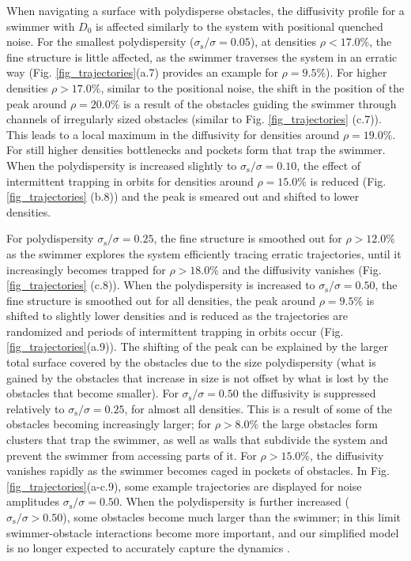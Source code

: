 \documentclass[aps,pre,twocolumn,showpacs,superscriptaddress,amsmath,amssymb,longbibliography]{revtex4-2}
\begin{document}
When navigating a surface with polydisperse obstacles, the diffusivity profile for a swimmer with $D_{\textrm{0}}$ is affected similarly to the system with positional quenched noise. For the smallest polydispersity ($\sigma_{\textrm{s}}/\sigma = 0.05$), at densities $\rho < 17.0 \% $, the fine structure is little affected, as the swimmer traverses the system in an erratic way (Fig. \ref{fig_trajectories}(a.7) provides an example for $\rho = 9.5 \%$). For higher densities $\rho > 17.0 \% $, similar to the positional noise, the shift in the position of the peak around $\rho = 20.0 \%$ is a result of the obstacles guiding the swimmer through channels of irregularly sized obstacles (similar to Fig. \ref{fig_trajectories} (c.7)). This leads to a local maximum in the diffusivity for densities around $\rho = 19.0\%$. For still higher densities bottlenecks and pockets form that trap the swimmer. When the polydispersity is increased slightly to $\sigma_{\textrm{s}}/\sigma = 0.10$, the effect of intermittent trapping in orbits for densities around $\rho = 15.0 \%$ is reduced (Fig. \ref{fig_trajectories} (b.8)) and the peak is smeared out and shifted to lower densities. 

For polydispersity  $\sigma_{\textrm{s}}/\sigma = 0.25$, the fine structure is smoothed out for $\rho > 12.0 \% $ as the swimmer explores the system efficiently tracing erratic trajectories, until it increasingly becomes trapped for $\rho > 18.0 \%$ and the diffusivity vanishes (Fig. \ref{fig_trajectories} (c.8)). When the polydispersity is increased to $\sigma_{\textrm{s}}/\sigma = 0.50$, the fine structure is smoothed out for all densities, the peak around $\rho = 9.5 \%$ is shifted to slightly lower densities and is reduced as the trajectories are randomized and periods of intermittent trapping in orbits occur (Fig. \ref{fig_trajectories}(a.9)). The shifting of the peak can be explained by the larger total surface covered by the obstacles due to the size polydispersity (what is gained by the obstacles that increase in size is not offset by what is lost by the obstacles that become smaller). For $\sigma_{\textrm{s}}/\sigma = 0.50$ the diffusivity is suppressed relatively to $\sigma_{\textrm{s}}/\sigma = 0.25$, for almost all densities. This is a result of some of the obstacles becoming increasingly larger; for $\rho > 8.0 \%$ the large obstacles form clusters that trap the swimmer, as well as walls that subdivide the system and prevent the swimmer from accessing parts of it. For $\rho > 15.0 \%$, the diffusivity vanishes rapidly as the swimmer becomes caged in pockets of obstacles. In Fig. \ref{fig_trajectories}(a-c.9), some example trajectories are displayed for noise amplitudes $\sigma_{\textrm{s}}/\sigma = 0.50$. When the polydispersity is further increased ($\sigma_{\textrm{s}}/\sigma > 0.50$), some obstacles become much larger than the swimmer; in this limit swimmer-obstacle interactions become more important, and our simplified model is no longer expected to accurately capture the dynamics \cite{following1, following2}.
\end{document}
